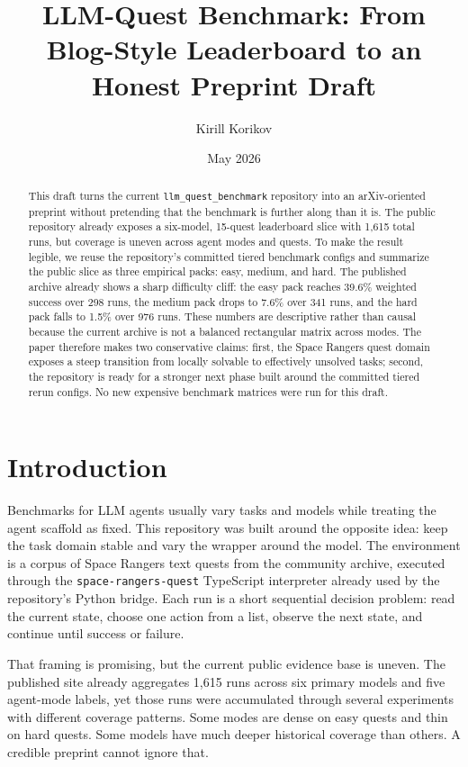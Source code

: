 \documentclass[11pt]{article}
\title{LLM-Quest Benchmark: From Blog-Style Leaderboard to an Honest Preprint Draft}
\author{Kirill Korikov}
\date{May 2026}
\begin{document}
\maketitle

\begin{abstract}
This draft turns the current \texttt{llm\_quest\_benchmark} repository into an arXiv-oriented preprint without pretending that the benchmark is further along than it is. The public repository already exposes a six-model, 15-quest leaderboard slice with 1{,}615 total runs, but coverage is uneven across agent modes and quests. To make the result legible, we reuse the repository's committed tiered benchmark configs and summarize the public slice as three empirical packs: easy, medium, and hard. The published archive already shows a sharp difficulty cliff: the easy pack reaches 39.6\% weighted success over 298 runs, the medium pack drops to 7.6\% over 341 runs, and the hard pack falls to 1.5\% over 976 runs. These numbers are descriptive rather than causal because the current archive is not a balanced rectangular matrix across modes. The paper therefore makes two conservative claims: first, the Space Rangers quest domain exposes a steep transition from locally solvable to effectively unsolved tasks; second, the repository is ready for a stronger next phase built around the committed tiered rerun configs. No new expensive benchmark matrices were run for this draft.
\end{abstract}

\section{Introduction}

Benchmarks for LLM agents usually vary tasks and models while treating the agent scaffold as fixed. This repository was built around the opposite idea: keep the task domain stable and vary the wrapper around the model. The environment is a corpus of Space Rangers text quests from the community archive, executed through the \texttt{space-rangers-quest} TypeScript interpreter already used by the repository's Python bridge. Each run is a short sequential decision problem: read the current state, choose one action from a list, observe the next state, and continue until success or failure.

That framing is promising, but the current public evidence base is uneven. The published site already aggregates 1{,}615 runs across six primary models and five agent-mode labels, yet those runs were accumulated through several experiments with different coverage patterns. Some modes are dense on easy quests and thin on hard quests. Some models have much deeper historical coverage than others. A credible preprint cannot ignore that.
\end{document}
